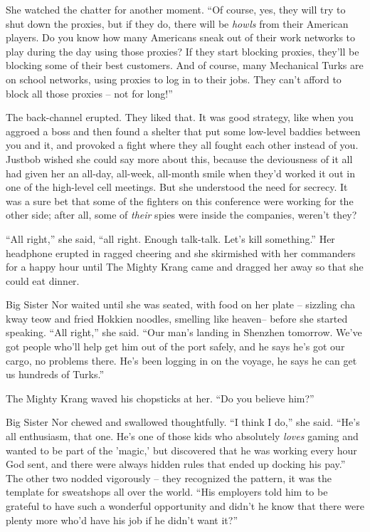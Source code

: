 She watched the chatter for another moment. ``Of course, yes, they
will try to shut down the proxies, but if they do, there will be
\emph{howls} from their American players. Do you know how many
Americans sneak out of their work networks to play during the day
using those proxies? If they start blocking proxies, they'll be
blocking some of their best customers. And of course, many
Mechanical Turks are on school networks, using proxies to log in to
their jobs. They can't afford to block all those proxies -- not for
long!''

The back-channel erupted. They liked that. It was good strategy,
like when you aggroed a boss and then found a shelter that put some
low-level baddies between you and it, and provoked a fight where
they all fought each other instead of you. Justbob wished she could
say more about this, because the deviousness of it all had given
her an all-day, all-week, all-month smile when they'd worked it out
in one of the high-level cell meetings. But she understood the need
for secrecy. It was a sure bet that some of the fighters on this
conference were working for the other side; after all, some of
\emph{their} spies were inside the companies, weren't they?

``All right,'' she said, ``all right. Enough talk-talk. Let's kill
something.'' Her headphone erupted in ragged cheering and she
skirmished with her commanders for a happy hour until The Mighty
Krang came and dragged her away so that she could eat dinner.

Big Sister Nor waited until she was seated, with food on her plate
-- sizzling cha kway teow and fried Hokkien noodles, smelling like
heaven-- before she started speaking. ``All right,'' she said. ``Our
man's landing in Shenzhen tomorrow. We've got people who'll help
get him out of the port safely, and he says he's got our cargo, no
problems there. He's been logging in on the voyage, he says he can
get us hundreds of Turks.''

The Mighty Krang waved his chopsticks at her. ``Do you believe
him?''

Big Sister Nor chewed and swallowed thoughtfully. ``I think I do,''
she said. ``He's all enthusiasm, that one. He's one of those kids
who absolutely \emph{loves} gaming and wanted to be part of the
'magic,' but discovered that he was working every hour God sent,
and there were always hidden rules that ended up docking his pay.''
The other two nodded vigorously -- they recognized the pattern, it
was the template for sweatshops all over the world. ``His employers
told him to be grateful to have such a wonderful opportunity and
didn't he know that there were plenty more who'd have his job if he
didn't want it?''

